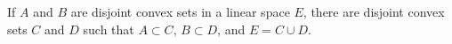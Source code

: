 If $A$ and $B$ are disjoint convex sets in a linear space $E$, there are disjoint convex sets $C$ and $D$ such that $A \subset C$, $B \subset D$, and $E = C \cup D$.
